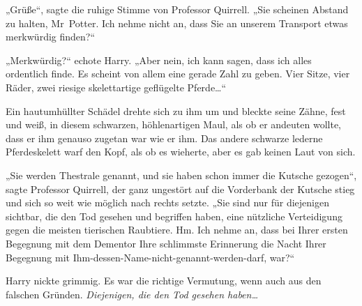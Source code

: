 „Grüße“, sagte die ruhige Stimme von Professor Quirrell. „Sie scheinen Abstand zu halten, Mr~Potter. Ich nehme nicht an, dass Sie an unserem Transport etwas merkwürdig finden?“

„Merkwürdig?“ echote Harry. „Aber nein, ich kann sagen, dass ich alles ordentlich finde. Es scheint von allem eine gerade Zahl zu geben. Vier Sitze, vier Räder, zwei riesige skelettartige geflügelte Pferde…“

Ein hautumhüllter Schädel drehte sich zu ihm um und bleckte seine Zähne, fest und weiß, in diesem schwarzen, höhlenartigen Maul, als ob er andeuten wollte, dass er ihm genauso zugetan war wie er ihm. Das andere schwarze lederne Pferdeskelett warf den Kopf, als ob es wieherte, aber es gab keinen Laut von sich.

„Sie werden Thestrale genannt, und sie haben schon immer die Kutsche gezogen“, sagte Professor Quirrell, der ganz ungestört auf die Vorderbank der Kutsche stieg und sich so weit wie möglich nach rechts setzte. „Sie sind nur für diejenigen sichtbar, die den Tod gesehen und begriffen haben, eine nützliche Verteidigung gegen die meisten tierischen Raubtiere. Hm. Ich nehme an, dass bei Ihrer ersten Begegnung mit dem Dementor Ihre schlimmste Erinnerung die Nacht Ihrer Begegnung mit Ihm-dessen-Name-nicht-genannt-werden-darf, war?“

Harry nickte grimmig. Es war die richtige Vermutung, wenn auch aus den falschen Gründen. \emph{Diejenigen, die den Tod gesehen haben…}

